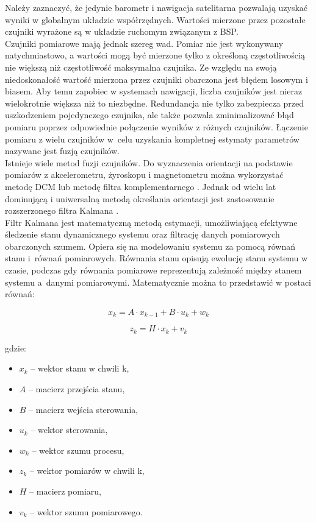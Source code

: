 Należy zaznaczyć, że jedynie barometr i nawigacja satelitarna pozwalają uzyskać wyniki w globalnym układzie współrzędnych. Wartości mierzone przez pozostałe czujniki wyrażone są w układzie ruchomym związanym z BSP.\\

Czujniki pomiarowe mają jednak szereg wad. Pomiar nie jest wykonywany natychmiastowo, a wartości mogą być mierzone tylko z określoną częstotliwością nie większą niż częstotliwość maksymalna czujnika. Ze względu na swoją niedoskonałość wartość mierzona przez czujniki obarczona jest błędem losowym i biasem. Aby temu zapobiec w systemach nawigacji, liczba czujników jest nieraz wielokrotnie większa niż to niezbędne. Redundancja nie tylko zabezpiecza przed uszkodzeniem pojedynczego czujnika, ale także pozwala zminimalizować błąd pomiaru poprzez odpowiednie połączenie wyników z różnych czujników. Łączenie pomiaru z wielu czujników w~celu uzyskania kompletnej estymaty parametrów nazywane jest fuzją czujników.\\

Istnieje wiele metod fuzji czujników. Do wyznaczenia orientacji na podstawie pomiarów z akcelerometru, żyroskopu i magnetometru można wykorzystać metodę DCM \cite{dcm} lub metodę filtra komplementarnego \cite{complementary}. Jednak od wielu lat dominującą i uniwersalną metodą określania orientacji jest zastosowanie rozszerzonego filtra Kalmana \cite{ekf_poor}.\\

Filtr Kalmana jest matematyczną metodą estymacji, umożliwiającą efektywne śledzenie stanu dynamicznego systemu oraz filtrację danych pomiarowych obarczonych szumem.
Opiera się na modelowaniu systemu za pomocą równań stanu i~równań pomiarowych. Równania stanu opisują ewolucję stanu systemu w czasie, podczas gdy równania pomiarowe reprezentują zależność między stanem systemu a~danymi pomiarowymi. Matematycznie można to przedstawić w postaci równań:

\[
  x_k = A \cdot x_{k-1} + B \cdot u_k + w_k
\]

\[
  z_k = H \cdot x_k + v_k
\]

gdzie:
\begin{itemize}
  \item $x_k$ -- wektor stanu w chwili k, 
  \item $A$ -- macierz przejścia stanu, 
  \item $B$  -- macierz wejścia sterowania, 
  \item $u_k$  -- wektor sterowania, 
  \item $w_k$ -- wektor szumu procesu, 
  \item $z_k$  -- wektor pomiarów w chwili  k, 
  \item $H$ -- macierz pomiaru,
  \item $v_k$ -- wektor szumu pomiarowego.
\end{itemize}

